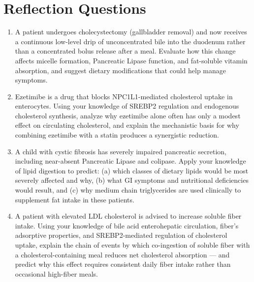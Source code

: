 \documentclass{tufte-handout}
\begin{document}
\section{Reflection Questions}
\begin{enumerate}
\item A patient undergoes cholecystectomy (gallbladder removal) and now receives a continuous low-level drip of unconcentrated bile into the duodenum rather than a concentrated bolus release after a meal. Evaluate how this change affects micelle formation, Pancreatic Lipase function, and fat-soluble vitamin absorption, and suggest dietary modifications that could help manage symptoms.
\item Ezetimibe is a drug that blocks NPC1L1-mediated cholesterol uptake in enterocytes. Using your knowledge of SREBP2 regulation and endogenous cholesterol synthesis, analyze why ezetimibe alone often has only a modest effect on circulating cholesterol, and explain the mechanistic basis for why combining ezetimibe with a statin produces a synergistic reduction.
\item A child with cystic fibrosis has severely impaired pancreatic secretion, including near-absent Pancreatic Lipase and colipase. Apply your knowledge of lipid digestion to predict: (a) which classes of dietary lipids would be most severely affected and why, (b) what GI symptoms and nutritional deficiencies would result, and (c) why medium chain triglycerides are used clinically to supplement fat intake in these patients.
\item A patient with elevated LDL cholesterol is advised to increase soluble fiber intake. Using your knowledge of bile acid enterohepatic circulation, fiber's adsorptive properties, and SREBP2-mediated regulation of cholesterol uptake, explain the chain of events by which co-ingestion of soluble fiber with a cholesterol-containing meal reduces net cholesterol absorption --- and predict why this effect requires consistent daily fiber intake rather than occasional high-fiber meals.
\end{enumerate}



\end{document}
